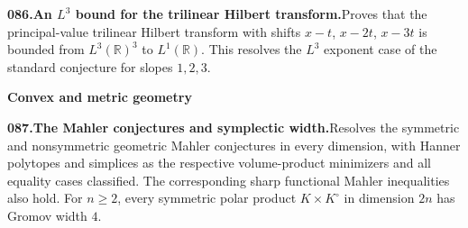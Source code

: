 \documentclass[11pt,a4paper]{article}
\begin{document}
  \par \begin{minipage}{\linewidth}
  \fontsize{10.5}{12.6}\selectfont\RaggedRight
  \hypertarget{result 086}{}
  {\bfseries\textcolor{muted}{086.}\enspace An $L^3$ bound for the trilinear Hilbert transform.}\enspace Proves that the principal-value trilinear Hilbert transform with shifts $x-t$, $x-2t$, $x-3t$ is bounded from $L^3(\mathbb R)^3$ to $L^1(\mathbb R)$. This resolves the $L^3$ exponent case of the standard conjecture for slopes $1,2,3$.\par
  \end{minipage}\par\vspace{5pt}



  \par{}\addvspace{12pt}
  \hypertarget{subject 8}{}\label{subject 8}
  {\fontsize{15}{18}\selectfont\bfseries Convex and metric geometry\par}
  \nobreak\vspace{9pt}\nobreak



  \par \begin{minipage}{\linewidth}
  \fontsize{10.5}{12.6}\selectfont\RaggedRight
  \hypertarget{result 087}{}
  {\bfseries\textcolor{muted}{087.}\enspace The Mahler conjectures and symplectic width.}\enspace Resolves the symmetric and nonsymmetric geometric Mahler conjectures in every dimension, with Hanner polytopes and simplices as the respective volume-product minimizers and all equality cases classified. The corresponding sharp functional Mahler inequalities also hold. For $n\ge2$, every symmetric polar product $K\times K^\circ$ in dimension $2n$ has Gromov width $4$.\par
  \end{minipage}\par\vspace{5pt}
\end{document}
